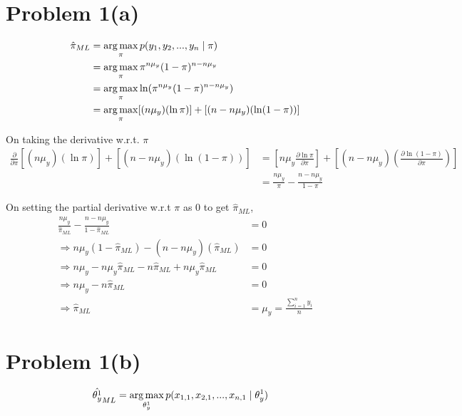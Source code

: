 \documentclass[openany,11pt]{homework}
\begin{document}
\maketitle

\section*{Problem 1(a)}

\begin{align}
\hat{\pi}_{ML} & = \operatornamewithlimits{arg\,max}_{\pi} p(y_1, y_2, ..., y_n \mid \pi) \\
			   & = \operatornamewithlimits{arg\,max}_{\pi} \pi^{n\mu_y}(1-\pi)^{n-n\mu_y} \\
			   & = \operatornamewithlimits{arg\,max}_{\pi} \ln(\pi^{n\mu_y}(1-\pi)^{n-n\mu_y}) \\
			   & = \operatornamewithlimits{arg\,max}_{\pi} [(n\mu_y) (\ln \pi)] + [(n - n\mu_y)(\ln (1-\pi))]
\end{align}

On taking the derivative w.r.t. $\pi$\\
\begin{align}
\frac{\partial }{\partial \pi} [(n\mu_y) (\ln \pi)] + [(n - n\mu_y)(\ln (1-\pi))]
& = \left[n\mu_y \frac{\partial \ln \pi}{\partial \pi}\right] + \left[(n - n\mu_y)\left(\frac{\partial \ln(1-\pi)}{\partial \pi}\right)\right] \\
& = \frac{n\mu_y}{\pi} -\frac{n-n\mu_y}{1-\pi}
\end{align}

On setting the partial derivative w.r.t $\pi$ as 0 to get $\hat{\pi}_{ML}$,
\begin{align}
\frac{n\mu_y}{\hat{\pi}_{ML}} -\frac{n-n\mu_y}{1-\hat{\pi}_{ML}} & = 0 \\
\Rightarrow n\mu_y(1-\hat{\pi}_{ML}) - (n-n\mu_y)(\hat{\pi}_{ML}) & = 0 \\
\Rightarrow n\mu_y - n\mu_y\hat{\pi}_{ML} - n\hat{\pi}_{ML} + n\mu_y\hat{\pi}_{ML} & = 0 \\
\Rightarrow n\mu_y - n\hat{\pi}_{ML} & = 0 \\
\Rightarrow \hat{\pi}_{ML} & = \mu_y = \frac{\sum_{i=1}^{n} y_i}{n}
\end{align}

\section*{Problem 1(b)}

\begin{align}
\hat{\theta_y^{1}}_{ML} & = \operatornamewithlimits{arg\,max}_{\theta_y^{1}} p(x_{1,1}, x_{2,1}, ..., x_{n, 1} \mid \theta_y^{1})
\end{align}
\end{document}
